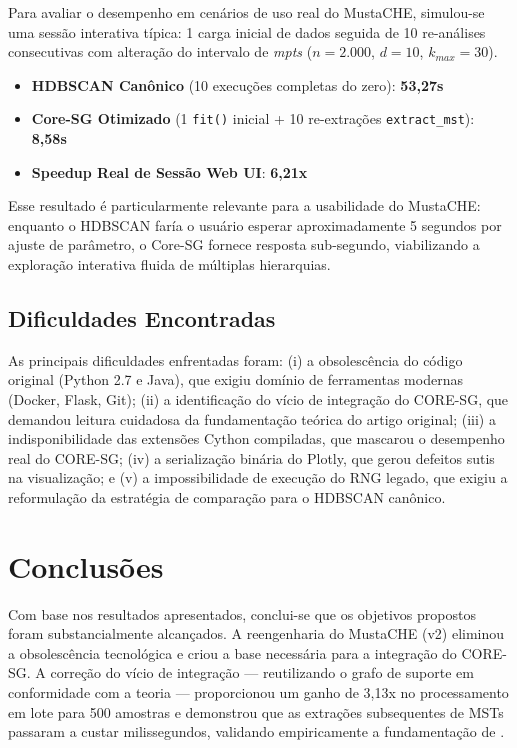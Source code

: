 \documentclass[12pt,a4paper,oneside]{article}
\begin{document}
Para avaliar o desempenho em cenários de uso real do MustaCHE, simulou-se uma sessão
interativa típica: 1 carga inicial de dados seguida de 10 re-análises consecutivas com
alteração do intervalo de \textit{mpts} ($n=2.000$, $d=10$, $k_{max}=30$).

\begin{itemize}
  \item \textbf{HDBSCAN Canônico} (10 execuções completas do zero): \textbf{53,27s}
  \item \textbf{Core-SG Otimizado} (1 \texttt{fit()} inicial + 10 re-extrações
        \texttt{extract\_mst}): \textbf{8,58s}
  \item \textbf{Speedup Real de Sessão Web UI}: \textbf{6,21x}
\end{itemize}

Esse resultado é particularmente relevante para a usabilidade do MustaCHE: enquanto o HDBSCAN
faría o usuário esperar aproximadamente 5 segundos por ajuste de parâmetro, o Core-SG fornece
resposta sub-segundo, viabilizando a exploração interativa fluida de múltiplas hierarquias.

\subsection{Dificuldades Encontradas}

As principais dificuldades enfrentadas foram: (i) a obsolescência do código original (Python
2.7 e Java), que exigiu domínio de ferramentas modernas (Docker, Flask, Git); (ii) a
identificação do vício de integração do CORE-SG, que demandou leitura cuidadosa da
fundamentação teórica do artigo original; (iii) a indisponibilidade das extensões Cython
compiladas, que mascarou o desempenho real do CORE-SG; (iv) a serialização binária do Plotly,
que gerou defeitos sutis na visualização; e (v) a impossibilidade de execução do RNG legado,
que exigiu a reformulação da estratégia de comparação para o HDBSCAN canônico.

\section{Conclusões}

Com base nos resultados apresentados, conclui-se que os objetivos propostos foram
substancialmente alcançados. A reengenharia do MustaCHE (v2) eliminou a obsolescência
tecnológica e criou a base necessária para a integração do CORE-SG. A correção do vício de
integração --- reutilizando o grafo de suporte em conformidade com a teoria --- proporcionou um
ganho de 3,13x no processamento em lote para 500 amostras e demonstrou que as extrações
subsequentes de MSTs passaram a custar milissegundos, validando empiricamente a fundamentação
de \textcite{naldi2022coresg}.
\end{document}
